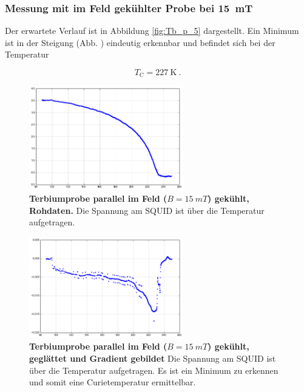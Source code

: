 \documentclass[a4paper,ngerman]{scrartcl}
\begin{document}
\subsubsection*{Messung mit im Feld gekühlter Probe bei \SI{15}{mT}}

Der erwartete Verlauf ist in Abbildung \ref{fig:Tb_p_5} dargestellt.
Ein Minimum ist in der Steigung (Abb. ) eindeutig erkennbar und befindet sich bei der Temperatur

\begin{equation}
T_{\mathrm{C}} = \SI{227}{\K} ~.
\end{equation}

\begin{figure}
\centering
\includegraphics[width=0.6\textwidth]{abbildungen/Tb_p_15.png}
\caption[Terbiumprobe parallel bei 15mT]{\textbf{Terbiumprobe parallel im Feld ($B = \SI{15}{mT}$) gekühlt, Rohdaten.} 
Die Spannung am SQUID ist über die Temperatur aufgetragen. }
\label{fig:Tb_p_15}
\end{figure}

\begin{figure}
\centering
\includegraphics[width=0.6\textwidth]{abbildungen/Tb_p_15_grad.png}
\caption[Terbiumprobe parallel bei 15mT]{\textbf{Terbiumprobe parallel im Feld ($B = \SI{15}{mT}$) gekühlt, geglättet und Gradient gebildet} 
Die Spannung am SQUID ist über die Temperatur aufgetragen. 
Es ist ein Minimum zu erkennen und somit eine Curietemperatur ermittelbar.}
\label{fig:Tb_p_15_grad}
\end{figure}
\end{document}
